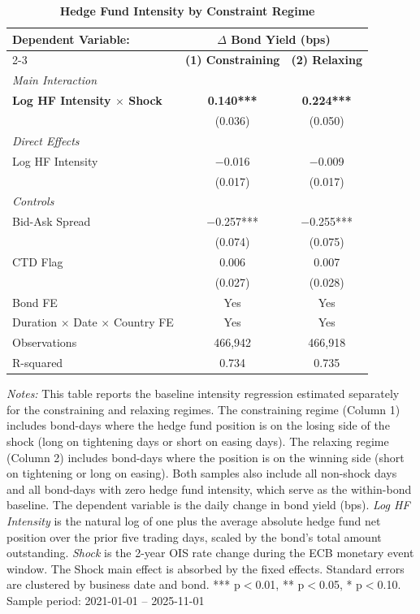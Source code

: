 \documentclass[english, 11pt, oneside]{article}
\begin{document}
\begin{table}[t]
\centering
\caption{\textbf{Hedge Fund Intensity by Constraint Regime}}
\footnotesize
\setlength{\tabcolsep}{12pt}
\renewcommand{\arraystretch}{1.1}
\begin{tabular}{l c c}
\toprule
\textbf{Dependent Variable:} & \multicolumn{2}{c}{\textbf{$\Delta$ Bond Yield (bps)}} \\
\cmidrule(lr){2-3}
 & \textbf{(1) Constraining} & \textbf{(2) Relaxing} \\
\midrule
\textit{Main Interaction} & & \\
\textbf{Log HF Intensity $\times$ Shock} & \textbf{0.140***} & \textbf{0.224***} \\
 & (0.036) & (0.050) \\
\addlinespace
\textit{Direct Effects} & & \\
Log HF Intensity & $-$0.016 & $-$0.009 \\
 & (0.017) & (0.017) \\
\addlinespace
\textit{Controls} & & \\
Bid-Ask Spread & $-$0.257*** & $-$0.255*** \\
 & (0.074) & (0.075) \\
CTD Flag & 0.006 & 0.007 \\
 & (0.027) & (0.028) \\
\midrule
Bond FE & Yes & Yes \\
Duration $\times$ Date $\times$ Country FE & Yes & Yes \\
\midrule
Observations & 466,942 & 466,918 \\
R-squared & 0.734 & 0.735 \\
\bottomrule
\end{tabular}
\label{tab:asymmetry}

\vspace{1ex}
\raggedright\scriptsize
\textit{Notes:} This table reports the baseline intensity regression estimated separately for the constraining and relaxing regimes. The constraining regime (Column 1) includes bond-days where the hedge fund position is on the losing side of the shock (long on tightening days or short on easing days). The relaxing regime (Column 2) includes bond-days where the position is on the winning side (short on tightening or long on easing). Both samples also include all non-shock days and all bond-days with zero hedge fund intensity, which serve as the within-bond baseline. The dependent variable is the daily change in bond yield (bps). \textit{Log HF Intensity} is the natural log of one plus the average absolute hedge fund net position over the prior five trading days, scaled by the bond's total amount outstanding. \textit{Shock} is the 2-year OIS rate change during the ECB monetary event window. The Shock main effect is absorbed by the fixed effects. Standard errors are clustered by business date and bond. *** p$<$0.01, ** p$<$0.05, * p$<$0.10. \\ Sample period: 2021-01-01 -- 2025-11-01
\end{table}
\end{document}
